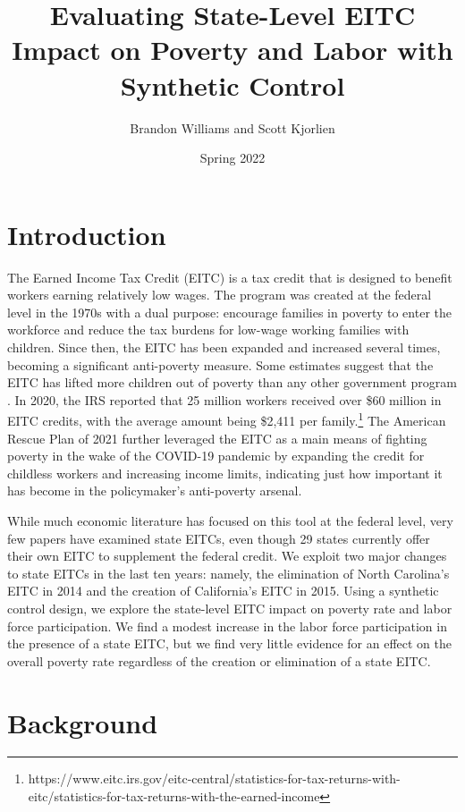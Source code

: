 \documentclass{article}
\author{Brandon Williams and Scott Kjorlien}
\title{Evaluating State-Level EITC Impact on Poverty and Labor with Synthetic Control}
\date{Spring 2022}
\begin{document}
\maketitle

\section{Introduction}

The Earned Income Tax Credit (EITC) is a tax credit that is designed to benefit workers earning relatively low wages. The program was created at the federal level in the 1970s with a dual purpose: encourage families in poverty to enter the workforce and reduce the tax burdens for low-wage working families with children. Since then, the EITC has been expanded and increased several times, becoming a significant anti-poverty measure. Some estimates suggest that the EITC has lifted more children out of poverty than any other government program  \citep{zahradnik2004state}. In 2020, the IRS reported that 25 million workers received over \$60 million in EITC credits, with the average amount being \$2,411 per family.\footnote{https://www.eitc.irs.gov/eitc-central/statistics-for-tax-returns-with-eitc/statistics-for-tax-returns-with-the-earned-income} The American Rescue Plan of 2021 further leveraged the EITC as a main means of fighting poverty in the wake of the COVID-19 pandemic by expanding the credit for childless workers and increasing income limits, indicating just how important it has become in the policymaker’s anti-poverty arsenal.

While much economic literature has focused on this tool at the federal level, very few papers have examined state EITCs, even though 29 states currently offer their own EITC to supplement the federal credit. We exploit two major changes to state EITCs in the last ten years: namely, the elimination of North Carolina's EITC in 2014 and the creation of California's EITC in 2015. Using a synthetic control design, we explore the state-level EITC impact on poverty rate and labor force participation. We find a modest increase in the labor force participation in the presence of a state EITC, but we find very little evidence for an effect on the overall poverty rate regardless of the creation or elimination of a state EITC. 

\section{Background}
\end{document}
